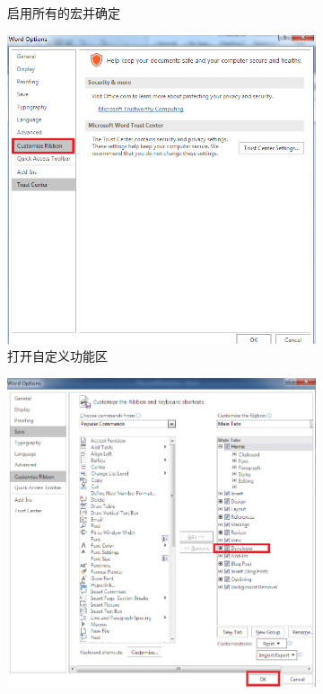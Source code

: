 \documentclass[10.5pt]{ctexart}
\begin{document}
\begin{enumerate}
\begin{figure}[!ht]
\begin{subfigure}[b]{0.4\textwidth}
        \caption{启用所有的宏并确定}
\end{subfigure}\qquad	
\begin{subfigure}[b]{0.4\textwidth}
        \includegraphics[width=\textwidth]{figure6.png}
        \caption{打开自定义功能区}
\end{subfigure}
\begin{subfigure}[b]{0.4\textwidth}
        \includegraphics[width=\textwidth]{figure7.png}

\end{subfigure}
\end{figure}
\end{enumerate}
\end{document}
